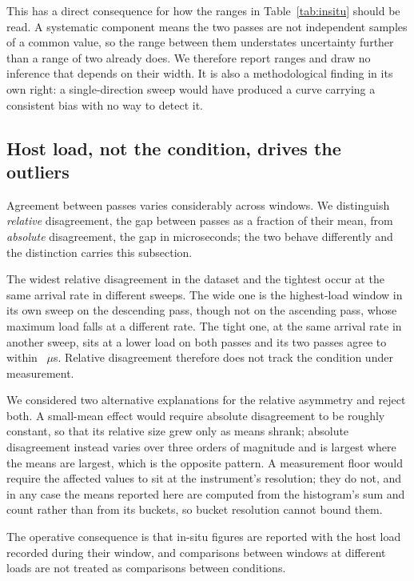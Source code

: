 \documentclass[preprint,12pt,authoryear]{elsarticle}
\begin{document}
This has a direct consequence for how the ranges in Table~\ref{tab:insitu} should
be read. A systematic component means the two passes are not independent samples
of a common value, so the range between them understates uncertainty further than
a range of two already does. We therefore report ranges and draw no inference that
depends on their width. It is also a methodological finding in its own right: a
single-direction sweep would have produced a curve carrying a consistent bias with
no way to detect it.

\subsection{Host load, not the condition, drives the outliers}\label{sec:load}

Agreement between passes varies considerably across windows. We distinguish
\emph{relative} disagreement, the gap between passes as a fraction of their mean,
from \emph{absolute} disagreement, the gap in microseconds; the two behave
differently and the distinction carries this subsection.

The widest relative disagreement in the dataset and the tightest occur at the same
arrival rate in different sweeps. The wide one is the highest-load window in its
own sweep on the descending pass, though not on the ascending pass, whose maximum
load falls at a different rate. The tight one, at the same arrival rate in another
sweep, sits at a lower load on both passes and its two passes agree to within
\InsituTightestAgreement~$\mu$s. Relative disagreement therefore does not track
the condition under measurement.

We considered two alternative explanations for the relative asymmetry and reject
both. A small-mean effect would require absolute disagreement to be roughly
constant, so that its relative size grew only as means shrank; absolute
disagreement instead varies over three orders of magnitude and is largest where
the means are largest, which is the opposite pattern. A measurement floor would
require the affected values to sit at the instrument's resolution; they do not,
and in any case the means reported here are computed from the histogram's sum and
count rather than from its buckets, so bucket resolution cannot bound them.

The operative consequence is that in-situ figures are reported with the host load
recorded during their window, and comparisons between windows at different loads
are not treated as comparisons between conditions.
\end{document}
